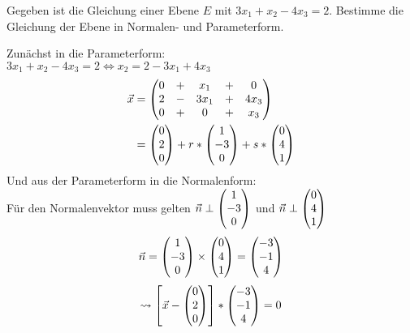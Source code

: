 










 Gegeben ist die Gleichung einer Ebene $E$ mit $3x_1+x_2-4x_3=2$. Bestimme die Gleichung der Ebene in Normalen- und Parameterform.
\begin{lsg}{}
	Zunächst in die Parameterform:\\
	$3x_1+x_2-4x_3=2 \Longleftrightarrow x_2=2-3x_1+4x_3$
	\begin{align*}
		\vec x &=\begin{pmatrix} 0 &+& x_1 &+& 0\\2 &-& 3x_1 &+& 4x_3\\0 &+& 0 &+& x_3 \end{pmatrix}\\
						&=\begin{pmatrix} 0\\2\\0 \end{pmatrix}+r*\begin{pmatrix} 1\\-3\\0 \end{pmatrix}+s*\begin{pmatrix} 0\\4\\1 \end{pmatrix}
	\end{align*}
	Und aus der Parameterform in die Normalenform:\\
	Für den Normalenvektor muss gelten $\vec n\perp \begin{pmatrix} 1\\-3\\0 \end{pmatrix}$ und $\vec n\perp \begin{pmatrix} 0\\4\\1 \end{pmatrix}$
	\begin{equation*}
		\vec n=\begin{pmatrix} 1\\-3\\0 \end{pmatrix}\times\begin{pmatrix} 0\\4\\1 \end{pmatrix}=\begin{pmatrix} -3\\-1\\4 \end{pmatrix}
	\end{equation*}
	\begin{equation*}
		\rightsquigarrow \left[\vec x-\begin{pmatrix} 0\\2\\0 \end{pmatrix}\right]*\begin{pmatrix} -3\\-1\\4 \end{pmatrix}=0
	\end{equation*}
\end{lsg}









